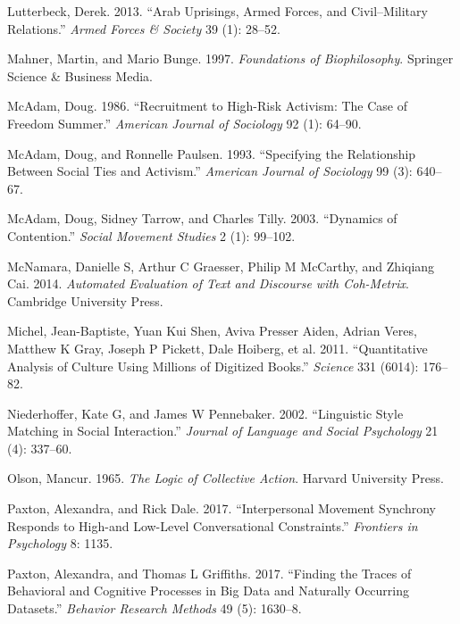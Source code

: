 \documentclass[english,man]{apa6}
\begin{document}
\leavevmode\hypertarget{ref-lutterbeck2013arab}{}%
Lutterbeck, Derek. 2013. ``Arab Uprisings, Armed Forces, and Civil--Military Relations.'' \emph{Armed Forces \& Society} 39 (1): 28--52.

\leavevmode\hypertarget{ref-mahner1997foundations}{}%
Mahner, Martin, and Mario Bunge. 1997. \emph{Foundations of Biophilosophy}. Springer Science \& Business Media.

\leavevmode\hypertarget{ref-mcadam1986recruitment}{}%
McAdam, Doug. 1986. ``Recruitment to High-Risk Activism: The Case of Freedom Summer.'' \emph{American Journal of Sociology} 92 (1): 64--90.

\leavevmode\hypertarget{ref-mcadam1993specifying}{}%
McAdam, Doug, and Ronnelle Paulsen. 1993. ``Specifying the Relationship Between Social Ties and Activism.'' \emph{American Journal of Sociology} 99 (3): 640--67.

\leavevmode\hypertarget{ref-mcadam2003dynamics}{}%
McAdam, Doug, Sidney Tarrow, and Charles Tilly. 2003. ``Dynamics of Contention.'' \emph{Social Movement Studies} 2 (1): 99--102.

\leavevmode\hypertarget{ref-mcnamara2014automated}{}%
McNamara, Danielle S, Arthur C Graesser, Philip M McCarthy, and Zhiqiang Cai. 2014. \emph{Automated Evaluation of Text and Discourse with Coh-Metrix}. Cambridge University Press.

\leavevmode\hypertarget{ref-michel2011quantitative}{}%
Michel, Jean-Baptiste, Yuan Kui Shen, Aviva Presser Aiden, Adrian Veres, Matthew K Gray, Joseph P Pickett, Dale Hoiberg, et al. 2011. ``Quantitative Analysis of Culture Using Millions of Digitized Books.'' \emph{Science} 331 (6014): 176--82.

\leavevmode\hypertarget{ref-niederhoffer2002linguistic}{}%
Niederhoffer, Kate G, and James W Pennebaker. 2002. ``Linguistic Style Matching in Social Interaction.'' \emph{Journal of Language and Social Psychology} 21 (4): 337--60.

\leavevmode\hypertarget{ref-olson1965logic}{}%
Olson, Mancur. 1965. \emph{The Logic of Collective Action}. Harvard University Press.

\leavevmode\hypertarget{ref-paxton2017interpersonal}{}%
Paxton, Alexandra, and Rick Dale. 2017. ``Interpersonal Movement Synchrony Responds to High-and Low-Level Conversational Constraints.'' \emph{Frontiers in Psychology} 8: 1135.

\leavevmode\hypertarget{ref-paxton2017finding}{}%
Paxton, Alexandra, and Thomas L Griffiths. 2017. ``Finding the Traces of Behavioral and Cognitive Processes in Big Data and Naturally Occurring Datasets.'' \emph{Behavior Research Methods} 49 (5): 1630--8.
\end{document}
